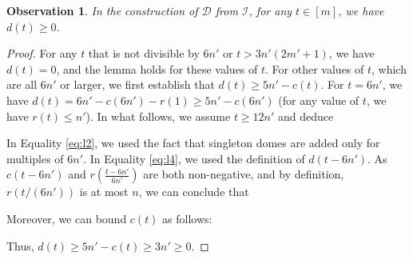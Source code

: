 \documentclass[letterpaper,11pt]{article}
\newtheorem{observation}{Observation}[section]
\begin{document}
\begin{observation}\label{obs:dt_nonnegative}
   In the construction of $\mathcal{D}$ from $\mathcal{I}$, for any $t\in [m]$, we have $d(t) \geq 0$. 
\end{observation}
\begin{proof}
    For any $t$ that is not divisible by $6n'$ or $t> 3n'(2m'+1)$, we have $d(t)=0$, and the lemma holds for these values of $t$. For other values of $t$, which are all $6n'$ or larger, we first establish that $d(t)\geq 5n' - c(t)$.  For $t=6n'$, we have $d(t) = 6n' - c(6n') - r(1) \geq 5n'-c(6n')$ (for any value of $t$, we have $r(t)\leq n'$). In what follows, we assume $t\geq 12n'$ and deduce

    
    In Equality \eqref{eq:l2}, we used the fact that singleton domes are added only for multiples of $6n'$. In Equality \eqref{eq:l4}, we used the definition of $d(t-6n')$. 
    As $c({t-6n'})$ and $r(\frac{t-6n'}{6n'})$ are both non-negative, and by definition, $r(t/(6n'))$ is at most $n$, we can conclude that

    Moreover, we can bound $c(t)$ as follows: 
    
    Thus, $d(t) \geq 5n' -c(t) \geq 3n' \geq 0$.  
\end{proof}
\end{document}
